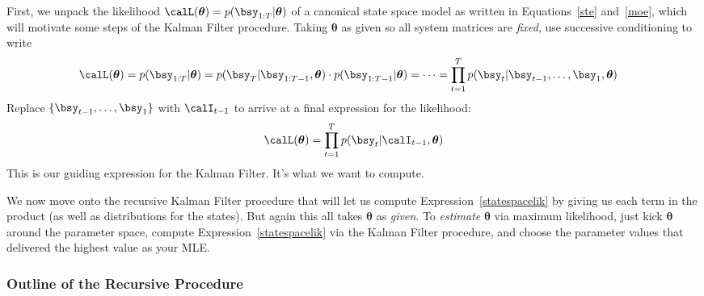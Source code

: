 \documentclass[12pt]{article}
\theoremstyle{plain}
\theoremstyle{definition}
\theoremstyle{remark}
\newcommand{\bstheta}{\boldsymbol{\theta}}
\newcommand{\prodtT}{\prod^T_{t=1}}
\begin{document}
First, we unpack the likelihood $\calL(\bstheta)=p(\bsy_{1:T}|\bstheta)$
of a canonical state space model as written in Equations~\ref{ste}
and~\ref{moe}, which will motivate some steps of the Kalman Filter
procedure. Taking $\bstheta$ as given so all system matrices are
\emph{fixed}, use successive conditioning to write
\begin{align*}
  \calL(\bstheta)
  = p(\bsy_{1:T}|\bstheta)
  = p(\bsy_T|\bsy_{1:T-1},\bstheta)\cdot p(\bsy_{1:T-1}|\bstheta)
  = \cdots
  &= \prodtT p(\bsy_t|\bsy_{t-1},\ldots,\bsy_1,\bstheta)
\end{align*}
Replace $\{\bsy_{t-1},\ldots,\bsy_1\}$ with $\calI_{t-1}$ to arrive at a
final expression for the likelihood:
\begin{align}
  \calL(\bstheta)
  = \prodtT p(\bsy_t|\calI_{t-1},\bstheta)
  \label{statespacelik}
\end{align}
This is our guiding expression for the Kalman Filter. It's what we want
to compute.

We now move onto the recursive Kalman Filter procedure that will let us
compute Expression~\ref{statespacelik} by giving us each term in the
product (as well as distributions for the states).
But again this all takes $\bstheta$ as \emph{given}.
To \emph{estimate} $\bstheta$ via maximum likelihood, just kick
$\bstheta$ around the parameter space, compute
Expression~\ref{statespacelik} via the Kalman Filter procedure, and choose
the parameter values that delivered the highest value as your MLE.


\subsubsection{Outline of the Recursive Procedure}
\label{subsec:kfoutline}
\end{document}
